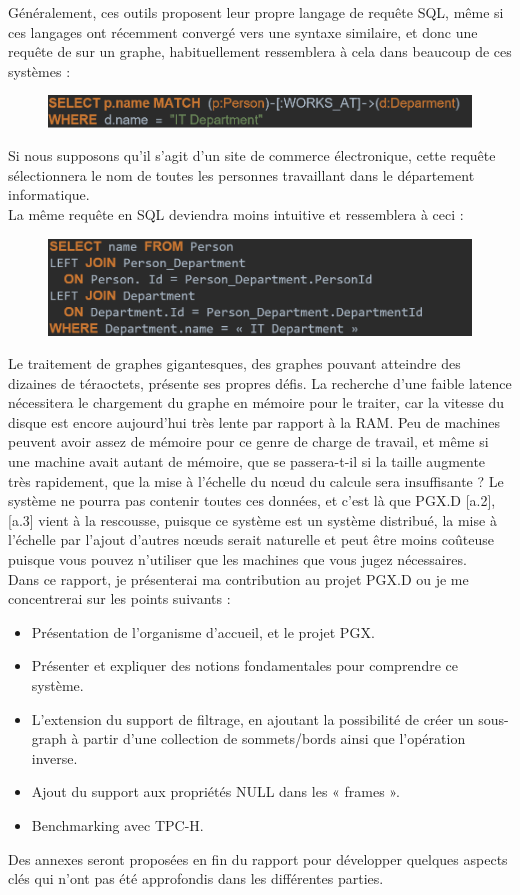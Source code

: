 Généralement, ces outils proposent leur propre langage de requête SQL, même si ces langages ont récemment convergé vers une syntaxe similaire, et donc une requête de sur un graphe, habituellement ressemblera à cela dans beaucoup de ces systèmes :\\
\begin{figure}[H]  
 \centering
    \includegraphics[width=1\textwidth]{exmp_pgql.PNG}
\end{figure}
Si nous supposons qu'il s'agit d'un site de commerce électronique, cette requête sélectionnera le nom de toutes les personnes travaillant dans le département informatique.\\
La même requête en SQL deviendra moins intuitive et ressemblera à ceci :
\begin{figure}[H]  
 \centering
    \includegraphics[width=1\textwidth]{exmp_sql.PNG}
\end{figure}

Le traitement de graphes gigantesques, des graphes pouvant atteindre des dizaines de téraoctets, présente ses propres défis. La recherche d’une faible latence nécessitera le chargement du graphe en mémoire pour le traiter, car la vitesse du disque est encore aujourd’hui très lente par rapport à la RAM. Peu de machines peuvent avoir assez de mémoire pour ce genre de charge de travail, et même si une machine avait autant de mémoire, que se passera-t-il si la taille augmente très rapidement, que la mise à l’échelle du nœud du calcule sera insuffisante ? Le système ne pourra pas contenir toutes ces données, et c’est là que PGX.D [a.2], [a.3] vient à la rescousse, puisque ce système est un système distribué, la mise à l’échelle par l’ajout d’autres nœuds serait naturelle et peut être moins coûteuse puisque vous pouvez n’utiliser que les machines que vous jugez nécessaires.\\
Dans ce rapport, je présenterai ma contribution au projet PGX.D ou je me concentrerai sur les points suivants :\\
\begin{itemize}[label=\textbullet]
\item Présentation de l’organisme d’accueil, et le projet PGX.
\item Présenter et expliquer des notions fondamentales pour comprendre ce système.
\item L’extension du support de filtrage, en ajoutant la possibilité de créer un sous-graph à partir d’une collection de sommets/bords ainsi que l’opération inverse.
\item Ajout du support aux propriétés NULL dans les « frames ».
\item Benchmarking avec TPC-H.
\end{itemize}

Des annexes seront proposées en fin du rapport pour développer quelques aspects clés qui n’ont pas été approfondis dans les différentes parties.